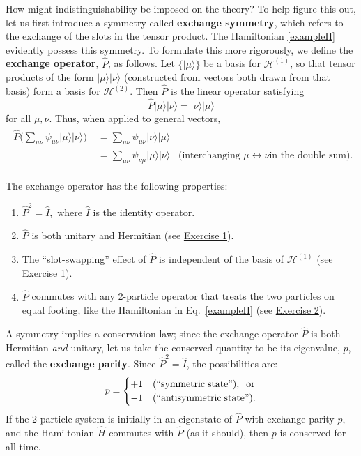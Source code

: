 \documentclass[prx,12pt]{revtex4-2}
\begin{document}
How might indistinguishability be imposed on the theory?  To help
figure this out, let us first introduce a symmetry called
\textbf{exchange symmetry}, which refers to the exchange of the slots
in the tensor product.  The Hamiltonian \eqref{exampleH} evidently
possess this symmetry.  To formulate this more rigorously, we define
the \textbf{exchange operator}, $\hat{P}$, as follows.  Let
$\{|\mu\rangle\}$ be a basis for $\mathscr{H}^{(1)}$, so that tensor
products of the form $|\mu\rangle |\nu\rangle$ (constructed from
vectors both drawn from that basis) form a basis for
$\mathscr{H}^{(2)}$.  Then $\hat{P}$ is the linear operator satisfying
\begin{equation}
  \hat{P} |\mu\rangle |\nu\rangle = |\nu\rangle|\mu\rangle
\end{equation}
for all $\mu, \nu$.  Thus, when applied to general vectors,
\begin{align}
  \begin{aligned}\hat{P} \Big (\sum_{\mu\nu}
    \psi_{\mu\nu} |\mu\rangle|\nu\rangle \Big)
    \;&=  \sum_{\mu\nu} \psi_{\mu\nu} |\nu\rangle|\mu\rangle \\
    &= \sum_{\mu\nu} \psi_{\nu\mu} |\mu\rangle|\nu\rangle
    \;\;\;\textrm{(interchanging $\mu\leftrightarrow \nu$
      in the double sum).}\end{aligned}
\end{align}

\noindent
The exchange operator has the following properties:
\begin{enumerate}
\item $\hat{P}^2 = \hat{I},$ where $\hat{I}$ is the identity operator.

\item $\hat{P}$ is both unitary and Hermitian (see
  \hyperref[ex:1]{Exercise 1}).
  
\item The ``slot-swapping'' effect of $\hat{P}$ is independent of the
  basis of $\mathscr{H}^{(1)}$ (see \hyperref[ex:1]{Exercise 1}).

\item $\hat{P}$ commutes with any 2-particle operator that treats the
  two particles on equal footing, like the Hamiltonian in
  Eq.~\eqref{exampleH} (see \hyperref[ex:2]{Exercise 2}).
\end{enumerate}

A symmetry implies a conservation law; since the exchange operator
$\hat{P}$ is both Hermitian \textit{and} unitary, let us take the
conserved quantity to be its eigenvalue, $p$, called the
\textbf{exchange parity}.  Since $\hat{P}^2 = \hat{I}$, the
possibilities are:
\begin{equation}
  p = \begin{cases}+1 & \textrm{(``symmetric\;state'')}, \;\;\textrm{or} \\ -1 & \textrm{(``antisymmetric\;state'').}\end{cases}
\end{equation}
If the 2-particle system is initially in an eigenstate of $\hat{P}$
with exchange parity $p$, and the Hamiltonian $\hat{H}$ commutes with
$\hat{P}$ (as it should), then $p$ is conserved for all time.
\end{document}
